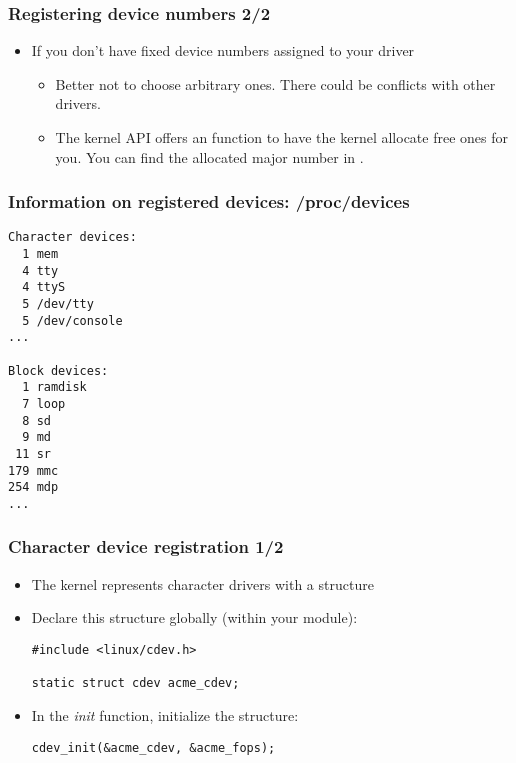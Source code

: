 \begin{frame}
  \frametitle{Registering device numbers 2/2}
  \begin{itemize}
  \item If you don't have fixed device numbers assigned to your driver
    \begin{itemize}
    \item Better not to choose arbitrary ones. There could be
      conflicts with other drivers.
    \item The kernel API offers an  function
      to have the kernel allocate free ones for you. You can find the
      allocated major number in .
    \end{itemize}
  \end{itemize}
\end{frame}

\begin{frame}[fragile]
  \frametitle{Information on registered devices: /proc/devices}
\begin{verbatim}
Character devices:
  1 mem
  4 tty
  4 ttyS
  5 /dev/tty
  5 /dev/console
...

Block devices:
  1 ramdisk
  7 loop
  8 sd
  9 md
 11 sr
179 mmc
254 mdp
...
\end{verbatim}
\end{frame}

\begin{frame}[fragile]
  \frametitle{Character device registration 1/2}
  \begin{itemize}
  \item The kernel represents character drivers with a  structure
  \item Declare this structure globally (within your module):
\begin{verbatim}
#include <linux/cdev.h>

static struct cdev acme_cdev;
\end{verbatim}
  \item In the \emph{init} function, initialize the structure:
\begin{verbatim}
cdev_init(&acme_cdev, &acme_fops);
\end{verbatim}
\end{itemize}
\end{frame}

